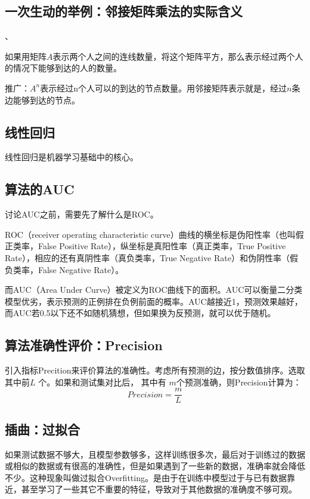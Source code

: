 \documentclass[letterpaper]{article} %
\begin{document}
\subsection{一次生动的举例：邻接矩阵乘法的实际含义}、

如果用矩阵$A$表示两个人之间的连线数量，将这个矩阵平方，那么表示经过两个人的情况下能够到达的人的数量。

推广：$A^n$表示经过n个人可以的到达的节点数量。用邻接矩阵表示就是，经过$n$条边能够到达的节点。

\subsection{线性回归}
线性回归是机器学习基础中的核心。

\subsection{算法的AUC}

讨论AUC之前，需要先了解什么是ROC。

ROC（receiver operating characteristic curve）曲线的横坐标是伪阳性率（也叫假正类率，False Positive Rate），纵坐标是真阳性率（真正类率，True Positive Rate），相应的还有真阴性率（真负类率，True Negative Rate）和伪阴性率（假负类率，False Negative Rate）。

而AUC（Area Under Curve）被定义为ROC曲线下的面积。AUC可以衡量二分类模型优劣，表示预测的正例排在负例前面的概率。AUC越接近1，预测效果越好，而AUC若0.5以下还不如随机猜想，但如果换为反预测，就可以优于随机。


\subsection{算法准确性评价：Precision}

引入指标Precition来评价算法的准确性。考虑所有预测的边，按分数值排序。选取其中前$L$ 个。如果和测试集对比后，
其中有 $m $个预测准确，则Precision计算为：
$$Precision = \frac{m}{L}$$

\subsection{插曲：过拟合}

如果测试数据不够大，且模型参数够多，这样训练很多次，最后对于训练过的数据或相似的数据或有很高的准确性，但是如果遇到了一些新的数据，准确率就会降低不少。这种现象叫做过拟合Overfitting。是由于在训练中模型过于与已有数据靠近，甚至学习了一些其它不重要的特征，导致对于其他数据的准确度不够可观。
\end{document}

